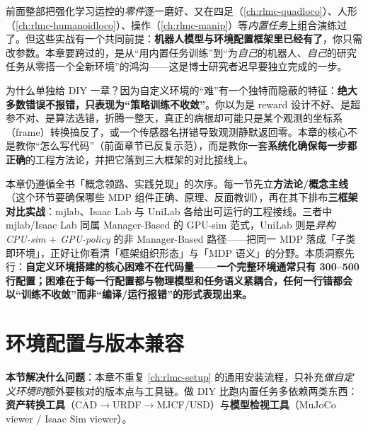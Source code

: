 前面整部把强化学习运控的\emph{零件}逐一磨好、又在四足（\cref{ch:rlmc-quadloco}）、人形（\cref{ch:rlmc-humanoidloco}）、操作（\cref{ch:rlmc-manip}）等\emph{内置任务}上组合演练过了。但这些实战有一个共同前提：\textbf{机器人模型与环境配置框架里已经有了}，你只需改参数。本章要跨过的，是从“用内置任务训练”到“为\emph{自己}的机器人、\emph{自己}的研究任务从零搭一个全新环境”的鸿沟——这是博士研究者迟早要独立完成的一步。

为什么单独给 DIY 一章？因为自定义环境的“难”有一个独特而隐蔽的特征：\textbf{绝大多数错误不报错，只表现为“策略训练不收敛”}。你以为是 reward 设计不好、是超参不对、是算法选错，折腾一整天，真正的病根却可能只是某个观测的坐标系（frame）转换搞反了，或一个传感器名拼错导致观测静默返回零。本章的核心不是教你“怎么写代码”（前面章节已反复示范），而是教你一套\textbf{系统化确保每一步都正确}的工程方法论，并把它落到三大框架的对比接线上。

本章仍遵循全书「概念领路、实践兑现」的次序。每一节先立\textbf{方法论/概念主线}（这个环节要确保哪些 MDP 组件正确、原理、反面教训），再在其下排布\textbf{三框架对比实战}：mjlab、Isaac Lab 与 UniLab 各给出可运行的工程接线。三者中 mjlab/Isaac Lab 同属 Manager-Based 的 GPU-sim 范式，UniLab 则是\emph{异构 CPU-sim $+$ GPU-policy} 的非 Manager-Based 路径——把同一 MDP 落成「子类即环境」，正好让你看清「框架组织形态」与「MDP 语义」的分野。本质洞察先行：\textbf{自定义环境搭建的核心困难不在代码量——一个完整环境通常只有 300--500 行配置；困难在于每一行配置都与物理模型和任务语义紧耦合，任何一行错都会以“训练不收敛”而非“编译/运行报错”的形式表现出来。}

\section{环境配置与版本兼容}
\label{sec:rlmc-diy-setup}

\textbf{本节解决什么问题}：本章不重复 \cref{ch:rlmc-setup} 的通用安装流程，只补充\emph{做自定义环境时}额外要核对的版本点与工具链。做 DIY 比跑内置任务多依赖两类东西：\textbf{资产转换工具}（CAD$\to$URDF$\to$MJCF/USD）与\textbf{模型检视工具}（MuJoCo viewer / Isaac Sim viewer）。

